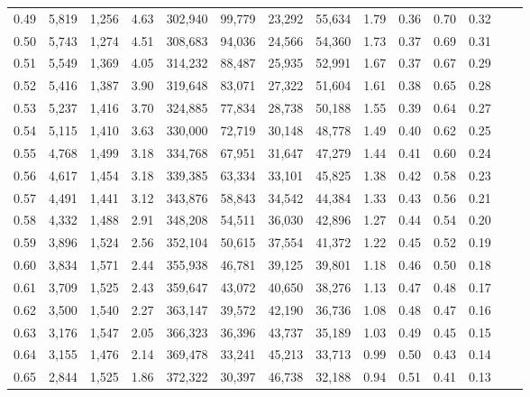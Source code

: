 \begin{tabular}{rrrrrrrrrrrrrr}
0.49 &  5,819 &  1,256 &     4.63 &  302,940 &   99,779 &  23,292 &  55,634 &  1.79 &  0.36 &  0.70 &      0.32 \\
0.50 &  5,743 &  1,274 &     4.51 &  308,683 &   94,036 &  24,566 &  54,360 &  1.73 &  0.37 &  0.69 &      0.31 \\
0.51 &  5,549 &  1,369 &     4.05 &  314,232 &   88,487 &  25,935 &  52,991 &  1.67 &  0.37 &  0.67 &      0.29 \\
0.52 &  5,416 &  1,387 &     3.90 &  319,648 &   83,071 &  27,322 &  51,604 &  1.61 &  0.38 &  0.65 &      0.28 \\
0.53 &  5,237 &  1,416 &     3.70 &  324,885 &   77,834 &  28,738 &  50,188 &  1.55 &  0.39 &  0.64 &      0.27 \\
0.54 &  5,115 &  1,410 &     3.63 &  330,000 &   72,719 &  30,148 &  48,778 &  1.49 &  0.40 &  0.62 &      0.25 \\
0.55 &  4,768 &  1,499 &     3.18 &  334,768 &   67,951 &  31,647 &  47,279 &  1.44 &  0.41 &  0.60 &      0.24 \\
0.56 &  4,617 &  1,454 &     3.18 &  339,385 &   63,334 &  33,101 &  45,825 &  1.38 &  0.42 &  0.58 &      0.23 \\
0.57 &  4,491 &  1,441 &     3.12 &  343,876 &   58,843 &  34,542 &  44,384 &  1.33 &  0.43 &  0.56 &      0.21 \\
0.58 &  4,332 &  1,488 &     2.91 &  348,208 &   54,511 &  36,030 &  42,896 &  1.27 &  0.44 &  0.54 &      0.20 \\
0.59 &  3,896 &  1,524 &     2.56 &  352,104 &   50,615 &  37,554 &  41,372 &  1.22 &  0.45 &  0.52 &      0.19 \\
0.60 &  3,834 &  1,571 &     2.44 &  355,938 &   46,781 &  39,125 &  39,801 &  1.18 &  0.46 &  0.50 &      0.18 \\
0.61 &  3,709 &  1,525 &     2.43 &  359,647 &   43,072 &  40,650 &  38,276 &  1.13 &  0.47 &  0.48 &      0.17 \\
0.62 &  3,500 &  1,540 &     2.27 &  363,147 &   39,572 &  42,190 &  36,736 &  1.08 &  0.48 &  0.47 &      0.16 \\
0.63 &  3,176 &  1,547 &     2.05 &  366,323 &   36,396 &  43,737 &  35,189 &  1.03 &  0.49 &  0.45 &      0.15 \\
0.64 &  3,155 &  1,476 &     2.14 &  369,478 &   33,241 &  45,213 &  33,713 &  0.99 &  0.50 &  0.43 &      0.14 \\
0.65 &  2,844 &  1,525 &     1.86 &  372,322 &   30,397 &  46,738 &  32,188 &  0.94 &  0.51 &  0.41 &      0.13 \\

\end{tabular}
